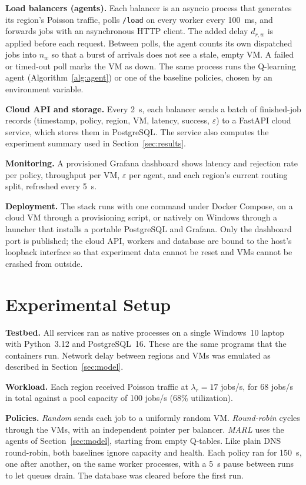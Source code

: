 \documentclass[conference]{IEEEtran}
\begin{document}
\textbf{Load balancers (agents).} Each balancer is an asyncio process that generates its region's Poisson traffic, polls \texttt{/load} on every worker every 100~ms, and forwards jobs with an asynchronous HTTP client. The added delay $d_{r,w}$ is applied before each request. Between polls, the agent counts its own dispatched jobs into $n_w$ so that a burst of arrivals does not see a stale, empty VM. A failed or timed-out poll marks the VM as down. The same process runs the Q-learning agent (Algorithm~\ref{alg:agent}) or one of the baseline policies, chosen by an environment variable.

\textbf{Cloud API and storage.} Every 2~s, each balancer sends a batch of finished-job records (timestamp, policy, region, VM, latency, success, $\varepsilon$) to a FastAPI cloud service, which stores them in PostgreSQL. The service also computes the experiment summary used in Section~\ref{sec:results}.

\textbf{Monitoring.} A provisioned Grafana dashboard shows latency and rejection rate per policy, throughput per VM, $\varepsilon$ per agent, and each region's current routing split, refreshed every 5~s.

\textbf{Deployment.} The stack runs with one command under Docker Compose, on a cloud VM through a provisioning script, or natively on Windows through a launcher that installs a portable PostgreSQL and Grafana. Only the dashboard port is published; the cloud API, workers and database are bound to the host's loopback interface so that experiment data cannot be reset and VMs cannot be crashed from outside.

\section{Experimental Setup}\label{sec:setup}
\textbf{Testbed.} All services ran as native processes on a single Windows~10 laptop with Python~3.12 and PostgreSQL~16. These are the same programs that the containers run. Network delay between regions and VMs was emulated as described in Section~\ref{sec:model}.

\textbf{Workload.} Each region received Poisson traffic at $\lambda_r = 17$ jobs/s, for 68 jobs/s in total against a pool capacity of 100 jobs/s (68\% utilization).

\textbf{Policies.}
\emph{Random} sends each job to a uniformly random VM.
\emph{Round-robin} cycles through the VMs, with an independent pointer per balancer.
\emph{MARL} uses the agents of Section~\ref{sec:model}, starting from empty Q-tables.
Like plain DNS round-robin, both baselines ignore capacity and health. Each policy ran for 150~s, one after another, on the same worker processes, with a 5~s pause between runs to let queues drain. The database was cleared before the first run.
\end{document}
